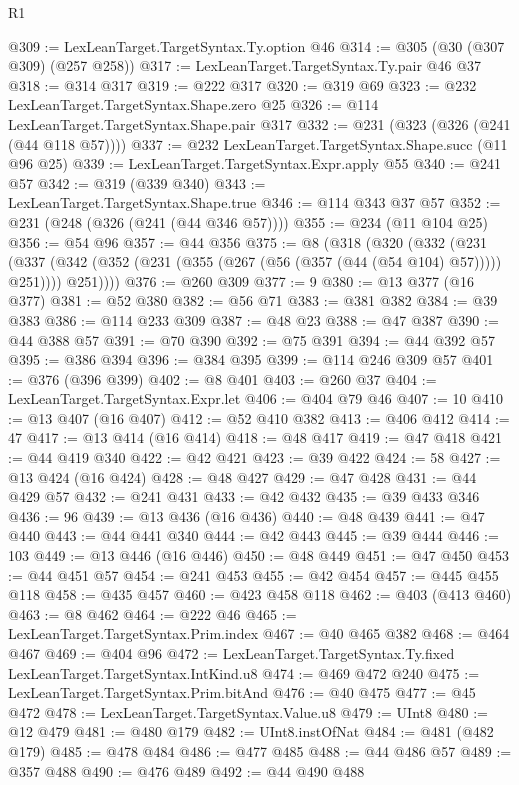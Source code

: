 \begin{lexlean}{R1}
\begin{coremodule}
@309 := LexLeanTarget.TargetSyntax.Ty.option @46
@314 := @305 (@30 (@307 @309) (@257 @258))
@317 := LexLeanTarget.TargetSyntax.Ty.pair @46 @37
@318 := @314 @317
@319 := @222 @317
@320 := @319 @69
@323 := @232 LexLeanTarget.TargetSyntax.Shape.zero @25
@326 := @114 LexLeanTarget.TargetSyntax.Shape.pair @317
@332 := @231 (@323 (@326 (@241 (@44 @118 @57))))
@337 := @232 LexLeanTarget.TargetSyntax.Shape.succ (@11 @96 @25)
@339 := LexLeanTarget.TargetSyntax.Expr.apply @55
@340 := @241 @57
@342 := @319 (@339 @340)
@343 := LexLeanTarget.TargetSyntax.Shape.true
@346 := @114 @343 @37 @57
@352 := @231 (@248 (@326 (@241 (@44 @346 @57))))
@355 := @234 (@11 @104 @25)
@356 := @54 @96
@357 := @44 @356
@375 := @8
    (@318
      (@320
        (@332
          (@231
            (@337 (@342 (@352 (@231 (@355 (@267 (@56 (@357 (@44 (@54 @104) @57))))) @251))))
            @251))))
@376 := @260 @309
@377 := 9
@380 := @13 @377 (@16 @377)
@381 := @52 @380
@382 := @56 @71
@383 := @381 @382
@384 := @39 @383
@386 := @114 @233 @309
@387 := @48 @23
@388 := @47 @387
@390 := @44 @388 @57
@391 := @70 @390
@392 := @75 @391
@394 := @44 @392 @57
@395 := @386 @394
@396 := @384 @395
@399 := @114 @246 @309 @57
@401 := @376 (@396 @399)
@402 := @8 @401
@403 := @260 @37
@404 := LexLeanTarget.TargetSyntax.Expr.let
@406 := @404 @79 @46
@407 := 10
@410 := @13 @407 (@16 @407)
@412 := @52 @410 @382
@413 := @406 @412
@414 := 47
@417 := @13 @414 (@16 @414)
@418 := @48 @417
@419 := @47 @418
@421 := @44 @419 @340
@422 := @42 @421
@423 := @39 @422
@424 := 58
@427 := @13 @424 (@16 @424)
@428 := @48 @427
@429 := @47 @428
@431 := @44 @429 @57
@432 := @241 @431
@433 := @42 @432
@435 := @39 @433 @346
@436 := 96
@439 := @13 @436 (@16 @436)
@440 := @48 @439
@441 := @47 @440
@443 := @44 @441 @340
@444 := @42 @443
@445 := @39 @444
@446 := 103
@449 := @13 @446 (@16 @446)
@450 := @48 @449
@451 := @47 @450
@453 := @44 @451 @57
@454 := @241 @453
@455 := @42 @454
@457 := @445 @455 @118
@458 := @435 @457
@460 := @423 @458 @118
@462 := @403 (@413 @460)
@463 := @8 @462
@464 := @222 @46
@465 := LexLeanTarget.TargetSyntax.Prim.index
@467 := @40 @465 @382
@468 := @464 @467
@469 := @404 @96
@472 := LexLeanTarget.TargetSyntax.Ty.fixed LexLeanTarget.TargetSyntax.IntKind.u8
@474 := @469 @472 @240
@475 := LexLeanTarget.TargetSyntax.Prim.bitAnd
@476 := @40 @475
@477 := @45 @472
@478 := LexLeanTarget.TargetSyntax.Value.u8
@479 := UInt8
@480 := @12 @479
@481 := @480 @179
@482 := UInt8.instOfNat
@484 := @481 (@482 @179)
@485 := @478 @484
@486 := @477 @485
@488 := @44 @486 @57
@489 := @357 @488
@490 := @476 @489
@492 := @44 @490 @488

\end{coremodule}
\end{lexlean}
